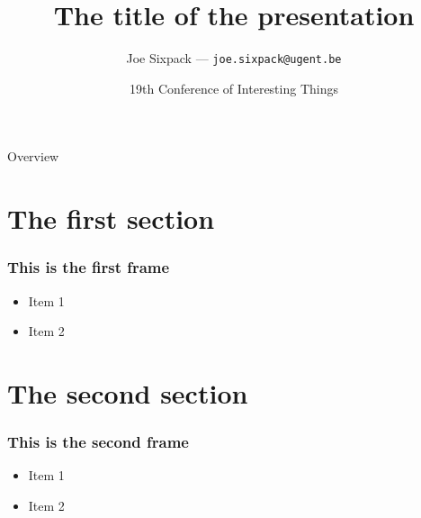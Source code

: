 \documentclass[aspectratio=169]{beamer}
\title{The title of the presentation}
\date{19th Conference of Interesting Things}
\author{Joe Sixpack --- \texttt{joe.sixpack@ugent.be}}
\begin{document}

\titleframe

\begin{frame}{Overview}
    \tableofcontents[hideallsubsections]
\end{frame}



\section{The first section}

\begin{frame}
    \frametitle{This is the first frame} 
    \begin{itemize}
        \item Item 1
        \item Item 2
    \end{itemize}
\end{frame}

\section{The second section}

\begin{frame}
    \frametitle{This is the second frame} 
    \begin{itemize}
        \item Item 1
        \item Item 2
    \end{itemize}
\end{frame}
\end{document}
